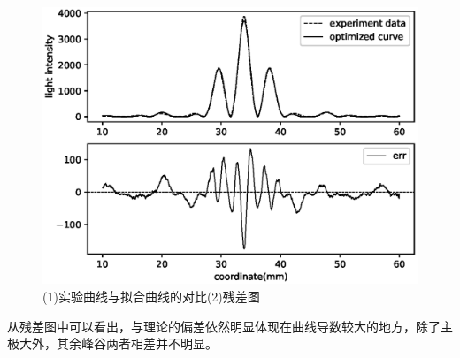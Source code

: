 \documentclass[a4paper]{ctexart}
\begin{document}
    \begin{figure}[htbp]
        \centering
        \includegraphics[scale=0.85]{image/double_fit.eps}
        \caption{(1)实验曲线与拟合曲线的对比\;\;(2)残差图}
    \end{figure}
    \par 
    从残差图中可以看出，与理论的偏差依然明显体现在曲线导数较大的地方，除了主极大外，其余峰谷两者相差并不明显。
\end{document}
